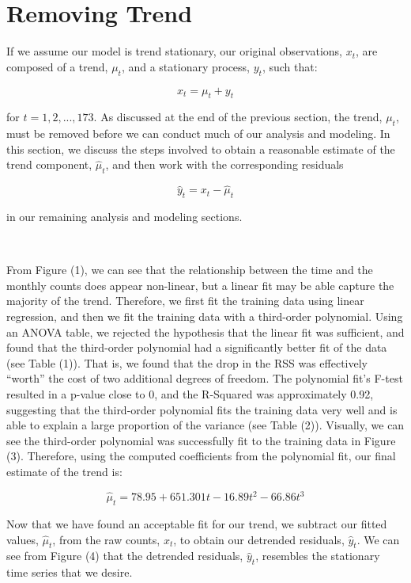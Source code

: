 \documentclass[10pt]{article}
\begin{document}
\section*{Removing Trend}
 
If we assume our model is trend stationary, our original observations, $x_t$, are composed of a trend, $\mu_t$, and a stationary process, $y_t$, such that:

$$ x_t = \mu_t + y_t$$

for $t = 1, 2, ..., 173$. As discussed at the end of the previous section, the trend, $\mu_t$, must be removed before we can conduct much of our analysis and modeling. In this section, we discuss the steps involved to obtain a reasonable estimate of the trend component, $\hat \mu_t$, and then work with the corresponding residuals

$$\hat y_t = x_t - \hat \mu_t$$

in our remaining analysis and modeling sections.

\

From Figure (1), we can see that the relationship between the time and the monthly counts does appear non-linear, but a linear fit may be able capture the majority of the trend. Therefore, we first fit the training data using linear regression, and then we fit the training data with a third-order polynomial. Using an ANOVA table, we rejected the hypothesis that the linear fit was sufficient, and found that the third-order polynomial had a significantly better fit of the data (see Table (1)). That is, we found that the drop in the RSS was effectively ``worth'' the cost of two additional degrees of freedom. The polynomial fit's F-test resulted in a p-value close to 0, and the R-Squared was approximately 0.92, suggesting that the third-order polynomial fits the training data very well and is able to explain a large proportion of the variance (see Table (2)). Visually, we can see the third-order polynomial was successfully fit to the training data in Figure (3). Therefore, using the computed coefficients from the polynomial fit, our final estimate of the trend is:

$$\hat \mu_t = 78.95 + 651.301t - 16.89t^2 - 66.86t^3$$

Now that we have found an acceptable fit for our trend, we subtract our fitted values, $\hat \mu_t$, from the raw counts, $x_t$, to obtain our detrended residuals, $\hat y_t$. We can see from Figure (4) that the detrended residuals, $\hat y_t$, resembles the stationary time series that we desire.
\end{document}

